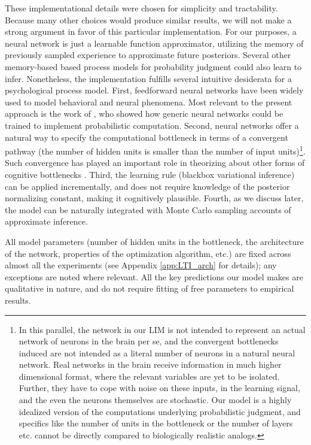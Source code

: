 These implementational details were chosen for simplicity and tractability. Because many other choices would produce similar results, we will not make a strong argument in favor of this particular implementation. For our purposes, a neural network is just a learnable function approximator, utilizing the memory of previously sampled experience to approximate future posteriors. Several other memory-based based process models for probability judgment \citep[for example:][]{dougherty1999minerva, shi2010exemplar, dasgupta2018remembrance, stewart2006decision, hertwig2009description} could also learn to infer. Nonetheless, the implementation fulfills several intuitive desiderata for a psychological process model. First, feedforward neural networks have been widely used to model behavioral and neural phenomena. Most relevant to the present approach is the work of \citet{orhan2017efficient}, who showed how generic neural networks could be trained to implement probabilistic computation. Second, neural networks offer a natural way to specify the computational bottleneck in terms of a convergent pathway (the number of hidden units is smaller than the number of input units)\footnote{In this parallel, the network in our LIM is not intended to represent an actual network of neurons in the brain per se, and the convergent bottlenecks induced are not intended as a literal number of neurons in a natural neural network. Real networks in the brain receive information in much higher dimensional format, where the relevant variables are yet to be isolated. Further, they have to cope with noise on these inputs, in the learning signal, and the even the neurons themselves are stochastic. Our model is a highly idealized version of the computations underlying probabilistic judgment, and specifics like the number of units in the bottleneck or the number of layers etc. cannot be directly compared to biologically realistic analogs.}. Such convergence has played an important role in theorizing about other forms of cognitive bottlenecks \citep[e.g.,][]{feng2014multitasking,alon2017graph}. Third, the learning rule (blackbox variational inference) can be applied incrementally, and does not require knowledge of the posterior normalizing constant, making it cognitively plausible. Fourth, as we discuss later, the model can be naturally integrated with Monte Carlo sampling accounts of approximate inference.

All model parameters (number of hidden units in the bottleneck, the architecture of the network, properties of the optimization algorithm, etc.) are fixed across almost all the experiments (see Appendix \ref{app:LTI_arch} for details); any exceptions are noted where relevant. All the key predictions our model makes are qualitative in nature, and do not require fitting of free parameters to empirical results.

